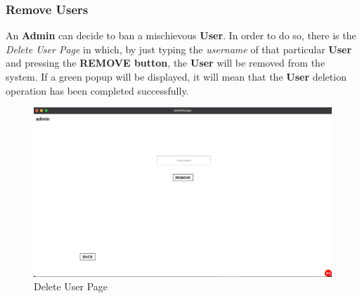 \subsubsection{Remove Users}
An \textbf{Admin} can decide to ban a mischievous \textbf{User}. In order to do so, there is the \textit{Delete User Page} in which, by just typing the \textit{username} of that particular \textbf{User} and pressing the \textbf{REMOVE button}, the \textbf{User} will be removed from the system. If a green popup will be displayed, it will mean that the \textbf{User} deletion operation has been completed successfully. 
\begin{figure}[H]
	\centering
	\includegraphics[width=\textwidth]{img/userManual/delete_user.png}
	\caption{Delete User Page}
\end{figure}